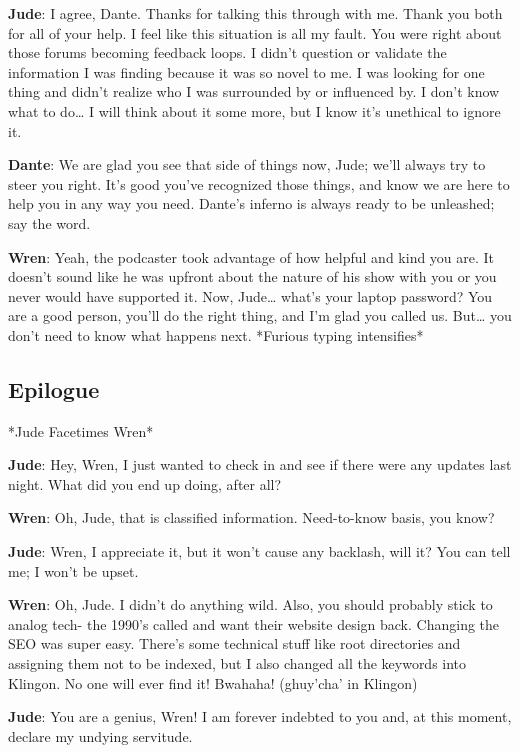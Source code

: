 \documentclass[
  letterpaper,
  DIV=11,
  numbers=noendperiod]{scrreprt}
\begin{document}
\textbf{Jude}: I agree, Dante. Thanks for talking this through with me.
Thank you both for all of your help. I feel like this situation is all
my fault. You were right about those forums becoming feedback loops. I
didn't question or validate the information I was finding because it was
so novel to me. I was looking for one thing and didn't realize who I was
surrounded by or influenced by. I don't know what to do\ldots{} I will
think about it some more, but I know it's unethical to ignore it.

\textbf{Dante}: We are glad you see that side of things now, Jude; we'll
always try to steer you right. It's good you've recognized those things,
and know we are here to help you in any way you need. Dante's inferno is
always ready to be unleashed; say the word.

\textbf{Wren}: Yeah, the podcaster took advantage of how helpful and
kind you are. It doesn't sound like he was upfront about the nature of
his show with you or you never would have supported it. Now,
Jude\ldots{} what's your laptop password? You are a good person, you'll
do the right thing, and I'm glad you called us. But\ldots{} you don't
need to know what happens next. *Furious typing intensifies*

\subsection{Epilogue}\label{epilogue}

*Jude Facetimes Wren*

\textbf{Jude}: Hey, Wren, I just wanted to check in and see if there
were any updates last night. What did you end up doing, after all?

\textbf{Wren}: Oh, Jude, that is classified information. Need-to-know
basis, you know?

\textbf{Jude}: Wren, I appreciate it, but it won't cause any backlash,
will it? You can tell me; I won't be upset.

\textbf{Wren}: Oh, Jude. I didn't do anything wild. Also, you should
probably stick to analog tech- the 1990's called and want their website
design back. Changing the SEO was super easy. There's some technical
stuff like root directories and assigning them not to be indexed, but I
also changed all the keywords into Klingon. No one will ever find it!
Bwahaha! (ghuy'cha' in Klingon)

\textbf{Jude}: You are a genius, Wren! I am forever indebted to you and,
at this moment, declare my undying servitude.
\end{document}
